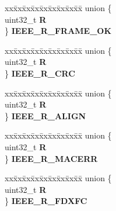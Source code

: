 \begin{DoxyCompactItemize}
\begin{tabbing}
\end{tabbing}\item 
\mbox{\label{structFEC__tag_a9c65c2346c2bf6ec2ba54b1e3fc81510}} 
\begin{tabbing}
xx\=xx\=xx\=xx\=xx\=xx\=xx\=xx\=xx\=\kill
union \{\\
\>uint32\_t {\bfseries R}\\
\} {\bfseries IEEE\_R\_FRAME\_OK}\\

\end{tabbing}\item 
\mbox{\label{structFEC__tag_ad233907b19e7d66b2c5e808a7518e9fa}} 
\begin{tabbing}
xx\=xx\=xx\=xx\=xx\=xx\=xx\=xx\=xx\=\kill
union \{\\
\>uint32\_t {\bfseries R}\\
\} {\bfseries IEEE\_R\_CRC}\\

\end{tabbing}\item 
\mbox{\label{structFEC__tag_af75704a66d5689bca03a3bcec774c9b6}} 
\begin{tabbing}
xx\=xx\=xx\=xx\=xx\=xx\=xx\=xx\=xx\=\kill
union \{\\
\>uint32\_t {\bfseries R}\\
\} {\bfseries IEEE\_R\_ALIGN}\\

\end{tabbing}\item 
\mbox{\label{structFEC__tag_a72e56e82c8078ec63c3add29ebd0a9f1}} 
\begin{tabbing}
xx\=xx\=xx\=xx\=xx\=xx\=xx\=xx\=xx\=\kill
union \{\\
\>uint32\_t {\bfseries R}\\
\} {\bfseries IEEE\_R\_MACERR}\\

\end{tabbing}\item 
\mbox{\label{structFEC__tag_a42b25170a3fd5387923861b4a894e4b6}} 
\begin{tabbing}
xx\=xx\=xx\=xx\=xx\=xx\=xx\=xx\=xx\=\kill
union \{\\
\>uint32\_t {\bfseries R}\\
\} {\bfseries IEEE\_R\_FDXFC}\\


\end{tabbing}
\end{DoxyCompactItemize}
